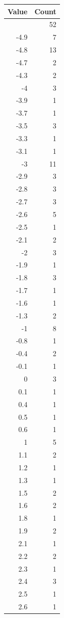 \documentclass[
]{article}
\begin{document}
\begin{figure}
\begin{minipage}{0.50\linewidth}
\begin{longtable}[]{@{}rr@{}}
\toprule\noalign{}
Value & Count \\
\midrule\noalign{}
\endhead
\bottomrule\noalign{}
\endlastfoot
-5 & 52 \\
-4.9 & 7 \\
-4.8 & 13 \\
-4.7 & 2 \\
-4.3 & 2 \\
-4 & 3 \\
-3.9 & 1 \\
-3.7 & 1 \\
-3.5 & 3 \\
-3.3 & 1 \\
-3.1 & 1 \\
-3 & 11 \\
-2.9 & 3 \\
-2.8 & 3 \\
-2.7 & 3 \\
-2.6 & 5 \\
-2.5 & 1 \\
-2.1 & 2 \\
-2 & 3 \\
-1.9 & 1 \\
-1.8 & 3 \\
-1.7 & 1 \\
-1.6 & 1 \\
-1.3 & 2 \\
-1 & 8 \\
-0.8 & 1 \\
-0.4 & 2 \\
-0.1 & 1 \\
0 & 3 \\
0.1 & 1 \\
0.4 & 1 \\
0.5 & 1 \\
0.6 & 1 \\
1 & 5 \\
1.1 & 2 \\
1.2 & 1 \\
1.3 & 1 \\
1.5 & 2 \\
1.6 & 2 \\
1.8 & 1 \\
1.9 & 2 \\
2.1 & 1 \\
2.2 & 2 \\
2.3 & 1 \\
2.4 & 3 \\
2.5 & 1 \\
2.6 & 1 \\

\end{longtable}
\end{minipage}
\end{figure}
\end{document}
